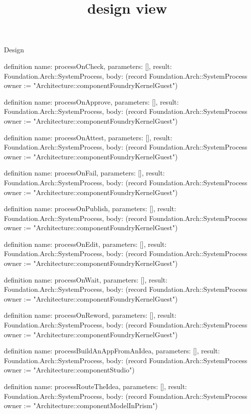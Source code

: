 \begin{lexlean}{Design}
\title{design view}
\begin{semanticmodule}
definition{
  name: processOnCheck,
  parameters: [],
  result: Foundation.Arch::SystemProcess,
  body: (record Foundation.Arch::SystemProcess {owner := "Architecture::componentFoundryKernelGuest"})
}

definition{
  name: processOnApprove,
  parameters: [],
  result: Foundation.Arch::SystemProcess,
  body: (record Foundation.Arch::SystemProcess {owner := "Architecture::componentFoundryKernelGuest"})
}

definition{
  name: processOnAttest,
  parameters: [],
  result: Foundation.Arch::SystemProcess,
  body: (record Foundation.Arch::SystemProcess {owner := "Architecture::componentFoundryKernelGuest"})
}

definition{
  name: processOnFail,
  parameters: [],
  result: Foundation.Arch::SystemProcess,
  body: (record Foundation.Arch::SystemProcess {owner := "Architecture::componentFoundryKernelGuest"})
}

definition{
  name: processOnPublish,
  parameters: [],
  result: Foundation.Arch::SystemProcess,
  body: (record Foundation.Arch::SystemProcess {owner := "Architecture::componentFoundryKernelGuest"})
}

definition{
  name: processOnEdit,
  parameters: [],
  result: Foundation.Arch::SystemProcess,
  body: (record Foundation.Arch::SystemProcess {owner := "Architecture::componentFoundryKernelGuest"})
}

definition{
  name: processOnWait,
  parameters: [],
  result: Foundation.Arch::SystemProcess,
  body: (record Foundation.Arch::SystemProcess {owner := "Architecture::componentFoundryKernelGuest"})
}

definition{
  name: processOnReword,
  parameters: [],
  result: Foundation.Arch::SystemProcess,
  body: (record Foundation.Arch::SystemProcess {owner := "Architecture::componentFoundryKernelGuest"})
}

definition{
  name: processBuildAnAppFromAnIdea,
  parameters: [],
  result: Foundation.Arch::SystemProcess,
  body: (record Foundation.Arch::SystemProcess {owner := "Architecture::componentStudio"})
}

definition{
  name: processRouteTheIdea,
  parameters: [],
  result: Foundation.Arch::SystemProcess,
  body: (record Foundation.Arch::SystemProcess {owner := "Architecture::componentModelInPrism"})
}


\end{semanticmodule}
\end{lexlean}
